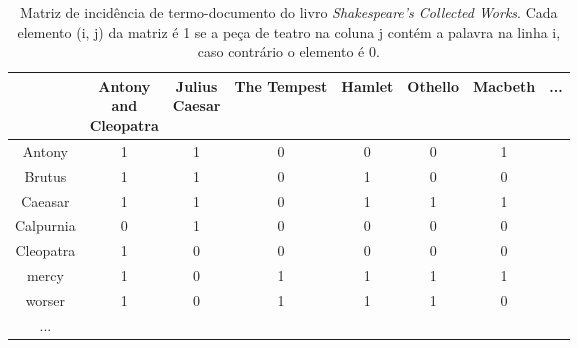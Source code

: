 \begin{table}[H]
    \centering
    \caption{Matriz de incidência de termo-documento do livro \textit{Shakespeare’s Collected Works}. Cada elemento (i, j) da matriz é 1 se a peça de teatro na coluna j contém a palavra na linha i, caso contrário o elemento é 0.}
    \begin{tabular}{|c|c|c|c|c|c|c|c}
        \hline
        \diagbox{Palavra}{
            \raisebox{-1.27cm}{
                \rotatebox{90}{
                    \parbox{1.6cm}{\centering Peça \\ de teatro}
                }
            }
        } 
        & \makecell{Antony \\ and \\ Cleopatra} 
        & \makecell{Julius \\ Caesar} 
        & The Tempest 
        & Hamlet 
        & Othello 
        & Macbeth 
        & ... 
        \\ \hline
        Antony     & 1 & 1 & 0 & 0 & 0 & 1 & \\
        Brutus     & 1 & 1 & 0 & 1 & 0 & 0 & \\
        Caeasar    & 1 & 1 & 0 & 1 & 1 & 1 & \\
        Calpurnia  & 0 & 1 & 0 & 0 & 0 & 0 & \\
        Cleopatra  & 1 & 0 & 0 & 0 & 0 & 0 & \\
        mercy      & 1 & 0 & 1 & 1 & 1 & 1 & \\
        worser     & 1 & 0 & 1 & 1 & 1 & 0 & \\
        ...        & & & & & & & 
    \end{tabular}
    \label{tab:matriz-incidência-termo-documento}
\end{table}